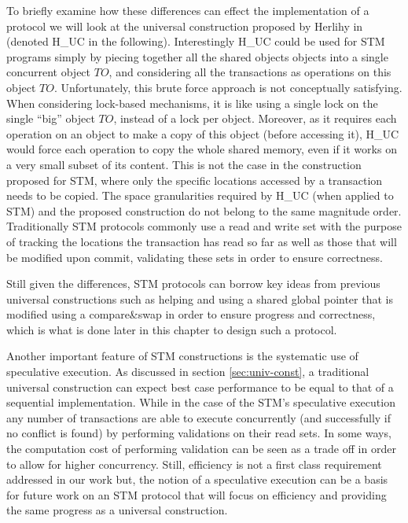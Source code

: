 To briefly examine how these differences can effect the implementation
of a protocol we will look at the universal construction proposed
by Herlihy in \cite{H91} (denoted H\_UC in the following).
Interestingly H\_UC could be used for STM programs simply  by
piecing together  all the shared objects objects into a single concurrent object 
$\mathit{TO}$,  and  considering   all  the   transactions   as  operations
on this   object $\mathit{TO}$.
Unfortunately, this  brute force approach is not conceptually satisfying.  
When considering lock-based mechanisms,   it is like using a single lock 
on  the single  ``big'' object $\mathit{TO}$, instead of a lock per object. 
Moreover, as it  requires each operation on an object to make a copy of 
this object   (before  accessing it),  H\_UC would force each  operation to
copy the whole  shared memory, even if  it works on a very  small subset of
its  content.  This is not the case in the construction proposed
for STM, where
only  the specific locations accessed by a transaction needs to be copied. 
The space granularities required by  H\_UC (when applied to STM)  and 
the proposed construction do not belong to the same magnitude order.
Traditionally STM protocols commonly use a read and write set
with the purpose of tracking the  locations the transaction  has read so far as well as those
that will be modified upon commit, validating these sets
in order to ensure correctness.

Still given the differences,
STM protocols can borrow key ideas from previous
universal constructions such as helping and using a shared global pointer
that is modified using a compare\&swap in order to ensure
progress and correctness, which is what is done later in this
chapter to design such a protocol.

Another important feature of  STM constructions
is the  systematic use of  speculative execution.
As discussed in section \ref{sec:univ-const}, a traditional universal construction can expect best
case performance to be equal to that of a sequential implementation.
While in the case of the STM's speculative execution
any number of transactions are able to execute concurrently (and successfully if no
conflict is  found) by performing  validations on their read  sets.
In some ways, the computation cost of performing validation can be seen as
a trade off in order to allow for higher concurrency.
Still,  efficiency is   not a  first class  requirement addressed  in our
work but, the notion of a  speculative  execution  can  be  a  basis  for  future
work  on  an STM protocol   that will focus on efficiency and  providing the same progress as a universal construction.

